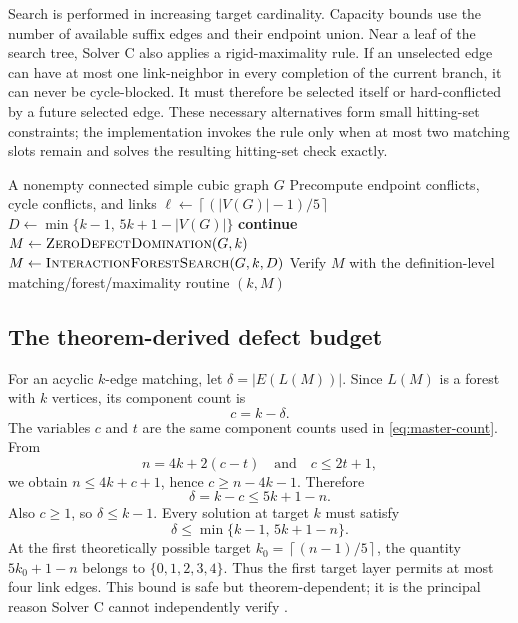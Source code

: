 \documentclass[smallextended,natbib,nospthms]{svjour3}
\theoremstyle{definition}
\theoremstyle{remark}
\newcommand{\ceil}[1]{\left\lceil #1\right\rceil}
\newcommand{\floor}[1]{\left\lfloor #1\right\rfloor}
\begin{document}
Search is performed in increasing target cardinality. Capacity bounds use the
number of available suffix edges and their endpoint union. Near a leaf of the
search tree, Solver C also applies a rigid-maximality rule. If an unselected
edge can have at most one link-neighbor in every completion of the current
branch, it can never be cycle-blocked. It must therefore be selected itself or
hard-conflicted by a future selected edge. These necessary alternatives form
small hitting-set constraints; the implementation invokes the rule only when
at most two matching slots remain and solves the resulting hitting-set check
exactly.

\begin{algorithm}[t]
\caption{Solver C: theorem-guided interaction-forest search}
\label{alg:solver-c}
\begin{algorithmic}[1]
\Require A nonempty connected simple cubic graph $G$
\State Precompute endpoint conflicts, cycle conflicts, and links
\State $\ell\gets\ceil{(|V(G)|-1)/5}$
\For{$k=\ell,\ell+1,\ldots,\floor{|V(G)|/2}$}
  \State $D\gets\min\{k-1,\,5k+1-|V(G)|\}$
    \State \textbf{continue}
    \State $M\gets\Call{ZeroDefectDomination}{G,k}$
  \Else
    \State $M\gets\Call{InteractionForestSearch}{G,k,D}$
  \EndIf
    \State Verify $M$ with the definition-level matching/forest/maximality routine
    \State \Return $(k,M)$
  \EndIf
\EndFor
\end{algorithmic}
\end{algorithm}

\subsection{The theorem-derived defect budget}

For an acyclic $k$-edge matching, let $\delta=|E(L(M))|$. Since $L(M)$ is a
forest with $k$ vertices, its component count is
\[
  c=k-\delta.
\]
The variables $c$ and $t$ are the same component counts used in
\eqref{eq:master-count}. From
\[
  n=4k+2(c-t)
  \quad\text{and}\quad
  c\leq 2t+1,
\]
we obtain $n\leq 4k+c+1$, hence $c\geq n-4k-1$. Therefore
\[
  \delta=k-c\leq 5k+1-n.
\]
Also $c\geq 1$, so $\delta\leq k-1$. Every solution at target $k$ must satisfy
\begin{equation}
  \boxed{\delta\leq\min\{k-1,\,5k+1-n\}.}
  \label{eq:defect-budget}
\end{equation}
At the first theoretically possible target
$k_0=\ceil{(n-1)/5}$, the quantity $5k_0+1-n$ belongs to
$\{0,1,2,3,4\}$. Thus the first target layer permits at most four link edges.
This bound is safe but theorem-dependent; it is the principal reason Solver C
cannot independently verify .
\end{document}
